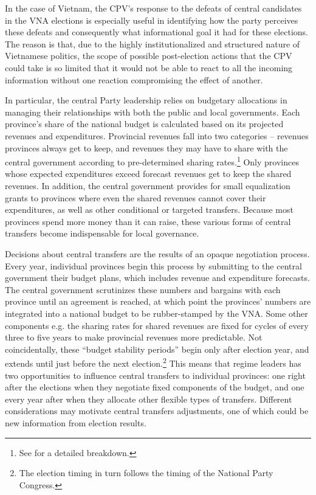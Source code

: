 \documentclass[12pt]{article}
\newcommand\fnote[1]{\footnote{\baselineskip=2\normalbaselineskip#1}}
\newcommand{\1}{\mathbbm{1}}
\begin{document}
In the case of Vietnam, the CPV's response to the defeats of central candidates in the VNA elections is especially useful in identifying how the party perceives these defeats and consequently what informational goal it had for these elections. The reason is that, due to the highly institutionalized and structured nature of Vietnamese politics, the scope of possible post-election actions that the CPV could take is so limited that it would not be able to react to all the incoming information without one reaction compromising the effect of another.

In particular, the central Party leadership relies on budgetary allocations in managing their relationships with both the public and local governments. Each province's share of the national budget is calculated based on its projected revenues and expenditures. Provincial revenues fall into two categories -- revenues provinces always get to keep, and revenues they may have to share with the central government according to pre-determined sharing rates.\fnote{See \citet{MartinezVazquez2004} for a detailed breakdown.} Only provinces whose expected expenditures exceed forecast revenues get to keep the shared revenues. In addition, the central government provides for small equalization grants to provinces where even the shared revenues cannot cover their expenditures, as well as other conditional or targeted transfers. Because most provinces spend more money than it can raise, these various forms of central transfers become indispensable for local governance.

Decisions about central transfers are the results of an opaque negotiation process. Every year, individual provinces begin this process by submitting to the central government their budget plans, which includes revenue and expenditure forecasts. The central government scrutinizes these numbers and bargains with each province until an agreement is reached, at which point the provinces' numbers are integrated into a national budget to be rubber-stamped by the VNA. Some other components e.g. the sharing rates for shared revenues are fixed for cycles of every three to five years to make provincial revenues more predictable. Not coincidentally, these ``budget stability periods'' begin only after election year, and extends until just before the next election.\fnote{The election timing in turn follows the timing of the National Party Congress.} This means that regime leaders has two opportunities to influence central transfers to individual provinces: one right after the elections when they negotiate fixed components of the budget, and one every year after when they allocate other flexible types of transfers. Different considerations may motivate central transfers adjustments, one of which could be new information from election results.
\end{document}
